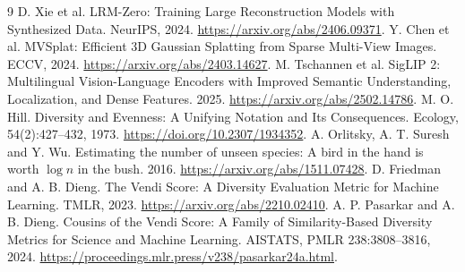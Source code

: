 \documentclass{article}
\begin{document}
\begin{thebibliography}{9}
 D. Xie et al. LRM-Zero: Training Large Reconstruction Models with Synthesized Data. NeurIPS, 2024. \url{https://arxiv.org/abs/2406.09371}.
 Y. Chen et al. MVSplat: Efficient 3D Gaussian Splatting from Sparse Multi-View Images. ECCV, 2024. \url{https://arxiv.org/abs/2403.14627}.
 M. Tschannen et al. SigLIP 2: Multilingual Vision-Language Encoders with Improved Semantic Understanding, Localization, and Dense Features. 2025. \url{https://arxiv.org/abs/2502.14786}.
 M. O. Hill. Diversity and Evenness: A Unifying Notation and Its Consequences. Ecology, 54(2):427--432, 1973. \url{https://doi.org/10.2307/1934352}.
 A. Orlitsky, A. T. Suresh and Y. Wu. Estimating the number of unseen species: A bird in the hand is worth $\log n$ in the bush. 2016. \url{https://arxiv.org/abs/1511.07428}.
 D. Friedman and A. B. Dieng. The Vendi Score: A Diversity Evaluation Metric for Machine Learning. TMLR, 2023. \url{https://arxiv.org/abs/2210.02410}.
 A. P. Pasarkar and A. B. Dieng. Cousins of the Vendi Score: A Family of Similarity-Based Diversity Metrics for Science and Machine Learning. AISTATS, PMLR 238:3808--3816, 2024. \url{https://proceedings.mlr.press/v238/pasarkar24a.html}.
\end{thebibliography}
\end{document}
